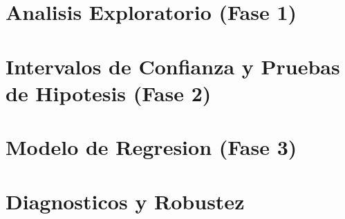 \documentclass[11pt, a4paper]{article}
\begin{document}
\section{Analisis Exploratorio (Fase 1)}

\section{Intervalos de Confianza y Pruebas de Hipotesis (Fase 2)}

\section{Modelo de Regresion (Fase 3)}

\section{Diagnosticos y Robustez}
\end{document}
